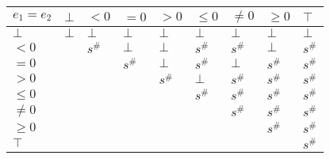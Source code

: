 \documentclass{article}
\begin{document}
\begin{table}[]
    \begin{tabular}{|l|l|l|l|l|l|l|l|l|}
    \hline
    $e_1 = e_2$ & $\bot$ & $<0$   & $=0$   & $>0$   & $\le 0$ & $\ne 0$ & $\ge 0$ & $\top$ \\ \hline
    $\bot$      & $\bot$ & $\bot$ & $\bot$ & $\bot$ & $\bot$  & $\bot$  & $\bot$  & $\bot$ \\ \hline
    $<0$        &        & $s^\#$ & $\bot$ & $\bot$ & $s^\#$  & $s^\#$  & $\bot$  & $s^\#$ \\ \hline
    $=0$        &        &        & $s^\#$ & $\bot$ & $s^\#$  & $\bot$  & $s^\#$  & $s^\#$ \\ \hline
    $>0$        &        &        &        & $s^\#$ & $\bot$  & $s^\#$  & $s^\#$  & $s^\#$ \\ \hline
    $\le 0$     &        &        &        &        & $s^\#$  & $s^\#$  & $s^\#$  & $s^\#$ \\ \hline
    $\ne 0$     &        &        &        &        &         & $s^\#$  & $s^\#$  & $s^\#$ \\ \hline
    $\ge 0$     &        &        &        &        &         &         & $s^\#$  & $s^\#$ \\ \hline
    $\top$      &        &        &        &        &         &         &         & $s^\#$ \\ \hline
    \end{tabular}
    \end{table}
\end{document}
